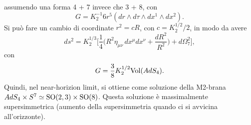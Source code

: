 assumendo una forma 4 + 7 invece che 3 + 8, con 
\begin{equation}
    G = K_2^{-1}6r^5(dr \wedge d\tau \wedge dx^1 \wedge dx^2).
\end{equation}
Si può fare un cambio di coordinate $r^2 = cR$, con $c = K_2^{1/2}/2$, in modo da avere 
\begin{equation}
    ds^2 = K_2^{1/3}\bigg[\frac{1}{4}\bigg(R^2\eta_{\mu\nu}\,dx^\mu dx^\nu + \frac{dR^2}{R^2}\bigg) + d\Omega_7^2\bigg],
\end{equation}
con 
\begin{equation}
    G = \frac{3}{8}K_2^{1/2}\mathrm{Vol}(AdS_4).
\end{equation}
Quindi, nel near-horizion limit, si ottiene come soluzione della M2-brana $AdS_4 \times S^7 \simeq \mathrm{SO}(2,3) \times \mathrm{SO}(8)$. Questa soluzione è massimalmente supersimmetrica (aumento della supersimmetria quando ci si avvicina all'orizzonte).

